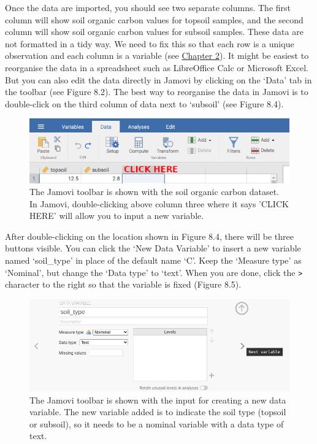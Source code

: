 \documentclass[
]{scrbook}
\begin{document}
Once the data are imported, you should see two separate columns.
The first column will show soil organic carbon values for topsoil samples, and the second column will show soil organic carbon values for subsoil samples.
These data are not formatted in a tidy way.
We need to fix this so that each row is a unique observation and each column is a variable (see \protect\hyperlink{Chapter_2}{Chapter 2}).
It might be easiest to reorganise the data in a spreadsheet such as LibreOffice Calc or Microsoft Excel.
But you can also edit the data directly in Jamovi by clicking on the `Data' tab in the toolbar (see Figure 8.2).
The best way to reorganise the data in Jamovi is to double-click on the third column of data next to `subsoil' (see Figure 8.4).

\begin{figure}
\includegraphics[width=1\linewidth]{img/jamovi_new_variable} \caption{The Jamovi toolbar is shown with the soil organic carbon dataset. In Jamovi, double-clicking above column three where it says 'CLICK HERE' will allow you to input a new variable.}\label{fig:unnamed-chunk-24}
\end{figure}

After double-clicking on the location shown in Figure 8.4, there will be three buttons visible.
You can click the `New Data Variable' to insert a new variable named `soil\_type' in place of the default name `C'.
Keep the `Measure type' as `Nominal', but change the `Data type' to `text'.
When you are done, click the \texttt{\textgreater{}} character to the right so that the variable is fixed (Figure 8.5).

\begin{figure}
\includegraphics[width=1\linewidth]{img/jamovi_set_variable} \caption{The Jamovi toolbar is shown with the input for creating a new data variable. The new variable added is to indicate the soil type (topsoil or subsoil), so it needs to be a nominal variable with a data type of text.}\label{fig:unnamed-chunk-25}
\end{figure}
\end{document}
